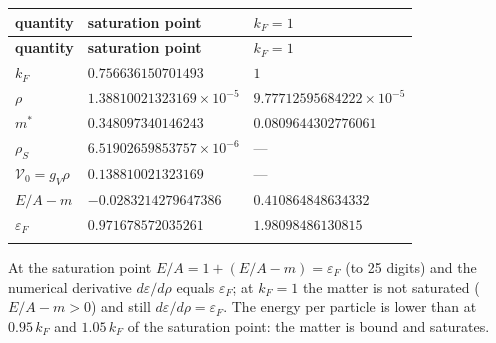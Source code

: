 \documentclass[10pt,a4paper]{article}
\begin{document}
{\small
\begin{longtable}{>{\raggedright\arraybackslash}p{}>{\raggedright\arraybackslash}p{}>{\raggedright\arraybackslash}p{}}
\toprule
\textbf{quantity} & \textbf{saturation point} & \textbf{$k_F=1$} \\
\midrule\endfirsthead
\toprule
\textbf{quantity} & \textbf{saturation point} & \textbf{$k_F=1$} \\
\midrule\endhead
\endfoot
\bottomrule\endlastfoot
$k_F$ & $0.756636150701493$ & $1$ \\
$\rho$ & $1.38810021323169\times10^{-5}$ & $9.77712595684222\times10^{-5}$ \\
$m^*$ & $0.348097340146243$ & $0.0809644302776061$ \\
$\rho_S$ & $6.51902659853757\times10^{-6}$ & — \\
$\mathcal V_0=g_V\rho$ & $0.138810021323169$ & — \\
$E/A-m$ & $-0.0283214279647386$ & $0.410864848634332$ \\
$\varepsilon_F$ & $0.971678572035261$ & $1.98098486130815$ \\*
\end{longtable}}
At the saturation point $E/A=1+(E/A-m)=\varepsilon_F$ (to 25 digits) and the numerical derivative $d\varepsilon/d\rho$ equals $\varepsilon_F$; at $k_F=1$ the matter is not saturated ($E/A-m>0$) and still $d\varepsilon/d\rho=\varepsilon_F$. The energy per particle is lower than at $0.95\,k_{F}$ and $1.05\,k_{F}$ of the saturation point: the matter is bound and saturates.
\end{document}
